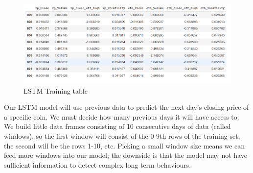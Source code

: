 \begin{figure}[h]
    \centering \includegraphics[scale=0.5]{images/lstm-data.png}
    \caption{LSTM Training table}
\end{figure}


Our LSTM model will use previous data to predict the next day's closing price of a specific coin. We must decide how many previous days it will have access to. We build little data frames consisting of 10 consecutive days of data (called windows), so the first window will consist of the 0-9th rows of the training set, the second will be the rows 1-10, etc. Picking a small window size means we can feed more windows into our model; the downside is that the model may not have sufficient information to detect complex long term behaviours.
